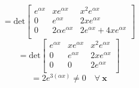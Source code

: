 \documentclass[letterpaper,12pt]{article}
\theoremstyle{definition}
\begin{document}
\[
= \text{det} 
\begin{bmatrix}
    e^{\alpha x} & x e^{\alpha x} & x^2 e^{\alpha x} \\
    0 & e^{\alpha x} & 2xe^{\alpha x} \\
    0 & 2 \alpha e^{\alpha x} & 2e^{\alpha x} + 4xe^{\alpha x} \\
\end{bmatrix}
\]
\[
= \text{det} 
\begin{bmatrix}
    e^{\alpha x} & x e^{\alpha x} & x^2 e^{\alpha x} \\
    0 & e^{\alpha x} & 2xe^{\alpha x} \\
    0 & 0 & 2e^{\alpha x} \\
\end{bmatrix}
\]
\[
=2e^{3(\alpha x)} \neq 0 \quad \forall ~  \mathbf{x}
\]
\end{document}
